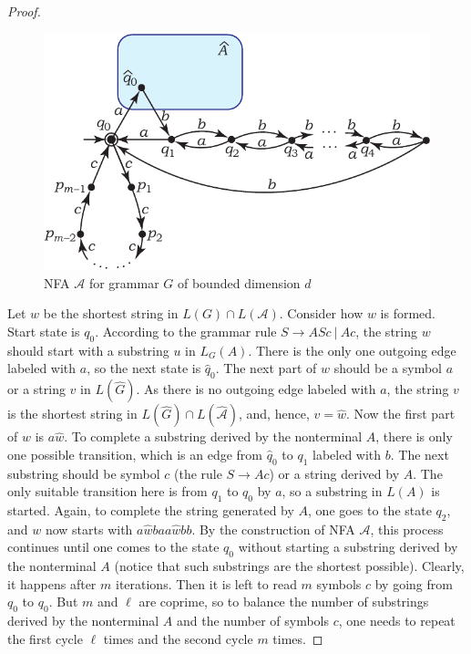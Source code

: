 \documentclass[runningheads]{llncs}
\begin{document}
\begin{proof}
\begin{figure}[t]
	\centering
	\includegraphics[scale=0.9]{pictures/rational_index_Ad}
	\caption{NFA $\mathcal{A}$ for grammar $G$ of bounded dimension $d$}
	\label{dimautomata:generalized}
\end{figure}

Let $w$ be the shortest string in $L(G) \cap L(\mathcal{A})$.
Consider how $w$ is formed.
Start state is $q_{0}$.
According to the grammar rule $S \to A S c\ \vert \ A c$,
the string $w$ should start with a substring $u$ in $L_G(A)$.
There is the only one outgoing edge labeled with $a$,
so the next state is $\widehat{q}_{0}$.
The next part of $w$ should be a symbol $a$
or a string $v$ in $L(\widehat{G})$.
As there is no outgoing edge labeled with $a$,
the string $v$ is the shortest string in $L(\widehat{G}) \cap L(\widehat{\mathcal{A}})$,
and, hence, $v = \widehat{w}$.
Now the first part of $w$ is $a \widehat{w}$.
To complete a substring derived by the nonterminal $A$,
there is only one possible transition,
which is an edge from $\widehat{q}_{0}$ to $q_1$ labeled with $b$.
The next substring should be symbol $c$ (the rule $S \to A c$) or a string derived by $A$.
The only suitable transition here is from $q_1$ to $q_0$ by $a$,
so a substring in $L(A)$ is started.
Again, to complete the string generated by $A$,
one goes to the state $q_2$,
and $w$ now starts with $a \widehat{w} b a a \widehat{w} b b$.
By the construction of NFA $\mathcal{A}$,
this process continues until one comes to the state $q_0$
without starting a substring derived by the nonterminal $A$
(notice that such substrings are the shortest possible).
Clearly, it happens after $m$ iterations.
Then it is left to read $m$ symbols $c$ by going from $q_0$ to $q_0$.
But $m$ and $\ell$ are coprime, so to balance the number of substrings
derived by the nonterminal $A$
and the number of symbols $c$,
one needs to repeat the first cycle $\ell$ times and the second cycle $m$ times.


\end{proof}
\end{document}
